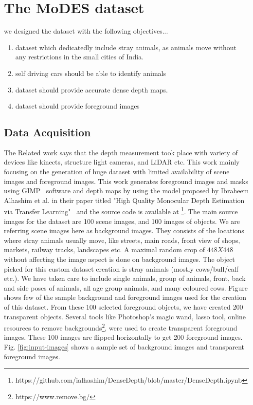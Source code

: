 \documentclass{article}
\begin{document}
\section{The MoDES dataset}
we designed the dataset with the following objectives...
\begin{enumerate}
\item dataset which dedicatedly include stray animals, as animals move without any restrictions in the small cities of India. 
\item self driving cars should be able to identify animals
\item dataset should provide accurate dense depth maps.
\item dataset should provide foreground images
\end{enumerate}

\subsection{Data Acquisition}
The Related work says that the depth measurement took place with variety of devices like kinects, structure light cameras, and LiDAR etc. This work mainly focusing on the generation of huge dataset with limited availability of scene images and foreground images. This work generates foreground images and masks using GIMP~\cite{howat2014greenland} software and depth maps by using the model proposed by Ibraheem Alhashim et al. in their paper titled "High Quality Monocular Depth Estimation via Transfer Learning"~\cite{alhashim2018high} and the source code is available at \footnote{https://github.com/ialhashim/DenseDepth/blob/master/DenseDepth.ipynb}. The main source images for the dataset are 100 scene images, and 100 images of objects. We are referring scene images here as background images. They consists of the locations where stray animals usually move, like streets, main roads, front view of shops, markets, railway tracks, landscapes etc. A maximal random crop of $448 X 448$ without affecting the image aspect is done on background images. The object picked for this custom dataset creation is stray animals (mostly cows/bull/calf etc.). We have taken care to include single animals, group of animals, front, back and side poses of animals, all age group animals, and many coloured cows. Figure shows few of the sample background and foreground images used for the creation of this dataset. From these 100 selected foreground objects, we have created 200 transparent objects. Several tools like Photoshop's magic wand, lasso tool, online resources to remove backgrounds\footnote{https://www.remove.bg/}, were used to create transparent foreground images. These 100 images are flipped horizontally to get 200 foreground images. Fig. \ref{fig:input-images} shows a sample set of background images and transparent foreground images.
\end{document}
